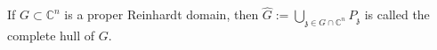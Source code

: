 If $G \subset \mathbb{C}^n$ is a proper Reinhardt domain, then $\hat{G} := \bigcup_{\mathfrak{z} \in G \cap \mathbb{C}^n} P_{\mathfrak{z}}$ is called the complete hull of $G$.
